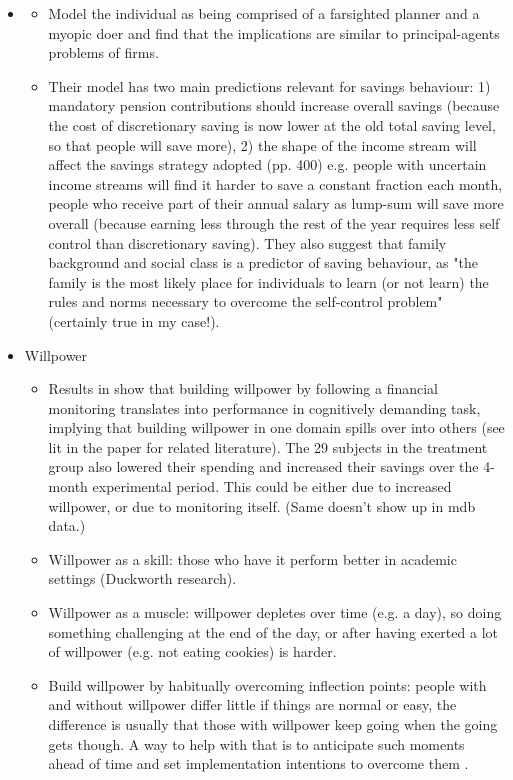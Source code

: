 \documentclass[a4paper, 11pt]{report}
\begin{document}
\begin{itemize}
	\item \citet{thaler1981economic}
	\begin{itemize}
		\item Model the individual as being comprised of a farsighted planner and a myopic doer and find that the implications are similar to principal-agents problems of firms.
		\item Their model has two main predictions relevant for savings behaviour: 1) mandatory pension contributions should increase overall savings (because the cost of discretionary saving is now lower at the old total saving level, so that people will save more), 2) the shape of the income stream will affect the savings strategy adopted (pp. 400) e.g. people with uncertain income streams will find it harder to save a constant fraction each month, people who receive part of their annual salary as lump-sum will save more overall (because earning less through the rest of the year requires less self control than discretionary saving). They also suggest that family background and social class is a predictor of saving behaviour, as "the family is the most likely place for individuals to learn (or not learn) the rules and norms necessary to overcome the self-control problem" (certainly true in my case!).
	\end{itemize}

	\item Willpower
	\begin{itemize}
		\item Results in \citet{oaten2007improvements} show that building willpower by following a financial monitoring translates into performance in cognitively demanding task, implying that building willpower in one domain spills over into others (see lit in the paper for related literature). The 29 subjects in the treatment group also lowered their spending and increased their savings over the 4-month experimental period. This could be either due to increased willpower, or due to monitoring itself. (Same doesn't show up in mdb data.)

		\item Willpower as a skill: those who have it perform better in academic settings (Duckworth research).

		\item Willpower as a muscle: willpower depletes over time (e.g. a day), so doing something challenging at the end of the day, or after having exerted a lot of willpower (e.g. not eating cookies) is harder.

		\item Build willpower by habitually overcoming inflection points: people with and without willpower differ little if things are normal or easy, the difference is usually that those with willpower keep going when the going gets though. A way to help with that is to anticipate such moments ahead of time and set implementation intentions to overcome them \citep{orbell2000motivational}.


\end{itemize}
\end{itemize}
\end{document}
